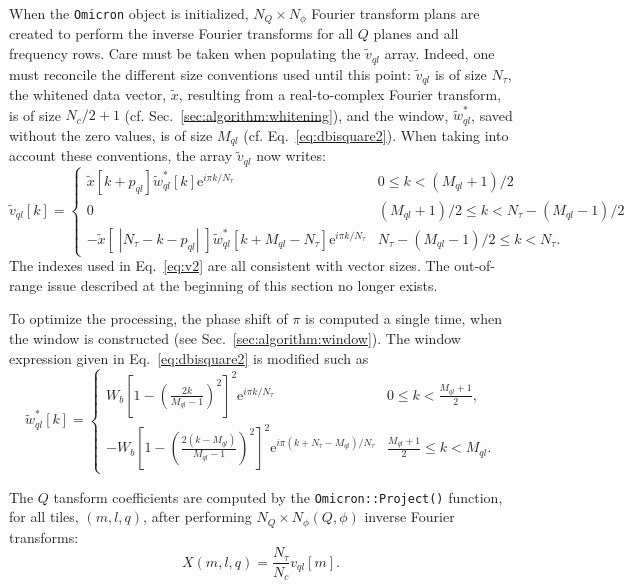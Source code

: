 When the \texttt{Omicron} object is initialized, $N_Q\times N_{\phi}$ Fourier transform plans are created to perform the inverse Fourier transforms for all $Q$ planes and all frequency rows. Care must be taken when populating the $\tilde{v}_{ql}$ array. Indeed, one must reconcile the different size conventions used until this point: $\tilde{v}_{ql}$ is of size $N_\tau $, the whitened data vector, $\tilde{x}$, resulting from a real-to-complex Fourier transform, is of size $N_c/2+1$ (cf. Sec.~\ref{sec:algorithm:whitening}), and the window, $\tilde{w}^*_{ql}$, saved without the zero values, is of size $M_{ql}$ (cf. Eq.~\ref{eq:dbisquare2}). When taking into account these conventions, the array $\tilde{v}_{ql}$ now writes:
\begin{equation}
  \tilde{v}_{ql}[k] =
  \begin{cases}
    \tilde{x}[k+p_{ql}]\tilde{w}_{ql}^*[k]\mathrm{e}^{i\pi k/N_\tau}                     & 0 \le k < (M_{ql}+1)/2 \\
    0                                                        & (M_{ql}+1)/2 \le k < N_\tau-(M_{ql}-1)/2 \\
    -\tilde{x}[\;|N_\tau-k-p_{ql}|\;]\tilde{w}_{ql}^*[k+M_{ql}-N_\tau]\mathrm{e}^{i\pi k/N_\tau} & N_\tau-(M_{ql}-1)/2 \le k < N_\tau.
  \end{cases}
  \label{eq:v2}
\end{equation}
The indexes used in Eq.~\ref{eq:v2} are all consistent with vector sizes. The out-of-range issue described at the beginning of this section no longer exists.

To optimize the processing, the phase shift of $\pi$ is computed a single time, when the window is constructed (see Sec.~\ref{sec:algorithm:window}). The window expression given in Eq.~\ref{eq:dbisquare2} is modified such as
\begin{equation}
  \tilde{w}_{ql}^*[k] =
  \begin{cases}
    W_b \left[1 - \left(\frac{2k}{M_{ql}-1}\right)^2 \right]^2 \mathrm{e}^{i\pi k/N_\tau} & 0\le k < \frac{M_{ql}+1}{2}, \\
    -W_b \left[1 - \left(\frac{2(k-M_{ql})}{M_{ql}-1}\right)^2 \right]^2 \mathrm{e}^{i\pi (k+N_\tau-M_{ql})/N_\tau} & \frac{M_{ql}+1}{2}\le k < M_{ql}.
  \end{cases}
\end{equation}

The $Q$ tansform coefficients are computed by the \texttt{Omicron::Project()} function, for all tiles, $(m,l,q)$, after performing $N_Q\times N_{\phi}(Q,\phi)$ inverse Fourier transforms:
\begin{equation}
  X(m, l, q) = \frac{N_\tau}{N_c} v_{ql}[m].
  \label{eq:qcoeff}
\end{equation}

